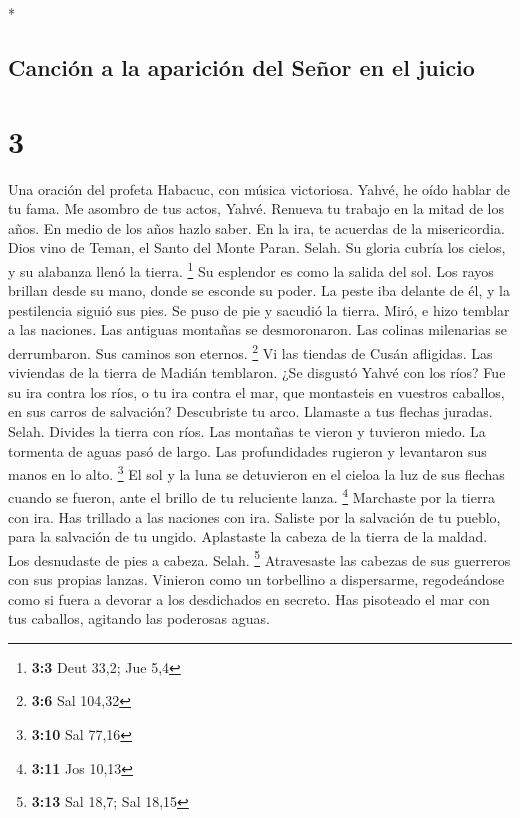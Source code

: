 \begin{paracol}{2}
\begin{otherlanguage}{english}
\end{otherlanguage}

\switchcolumn[0]*

\hypertarget{canciuxf3n-a-la-apariciuxf3n-del-seuxf1or-en-el-juicio}{%
\subsection{Canción a la aparición del Señor en el
juicio}\label{canciuxf3n-a-la-apariciuxf3n-del-seuxf1or-en-el-juicio}}

\hypertarget{section-4}{%
\section{3}\label{section-4}}

 Una oración del profeta Habacuc, con música victoriosa.
 Yahvé, he oído hablar de tu fama. Me asombro de tus
actos, Yahvé. Renueva tu trabajo en la mitad de los años. En medio de
los años hazlo saber. En la ira, te acuerdas de la misericordia.
 Dios vino de Teman, el Santo del Monte Paran. Selah. Su
gloria cubría los cielos, y su alabanza llenó la tierra. \footnote{\textbf{3:3}
  Deut 33,2; Jue 5,4}  Su esplendor es como la salida del
sol. Los rayos brillan desde su mano, donde se esconde su poder.
 La peste iba delante de él, y la pestilencia siguió sus
pies.  Se puso de pie y sacudió la tierra. Miró, e hizo
temblar a las naciones. Las antiguas montañas se desmoronaron. Las
colinas milenarias se derrumbaron. Sus caminos son eternos. \footnote{\textbf{3:6}
  Sal 104,32}  Vi las tiendas de Cusán afligidas. Las
viviendas de la tierra de Madián temblaron.  ¿Se disgustó
Yahvé con los ríos? Fue su ira contra los ríos, o tu ira contra el mar,
que montasteis en vuestros caballos, en sus carros de salvación?
 Descubriste tu arco. Llamaste a tus flechas juradas.
Selah. Divides la tierra con ríos.  Las montañas te
vieron y tuvieron miedo. La tormenta de aguas pasó de largo. Las
profundidades rugieron y levantaron sus manos en lo alto. \footnote{\textbf{3:10}
  Sal 77,16}  El sol y la luna se detuvieron en el cieloa
la luz de sus flechas cuando se fueron, ante el brillo de tu reluciente
lanza. \footnote{\textbf{3:11} Jos 10,13}  Marchaste por
la tierra con ira. Has trillado a las naciones con ira. 
Saliste por la salvación de tu pueblo, para la salvación de tu ungido.
Aplastaste la cabeza de la tierra de la maldad. Los desnudaste de pies a
cabeza. Selah. \footnote{\textbf{3:13} Sal 18,7; Sal 18,15}
 Atravesaste las cabezas de sus guerreros con sus propias
lanzas. Vinieron como un torbellino a dispersarme, regodeándose como si
fuera a devorar a los desdichados en secreto.  Has
pisoteado el mar con tus caballos, agitando las poderosas aguas.


\end{paracol}

